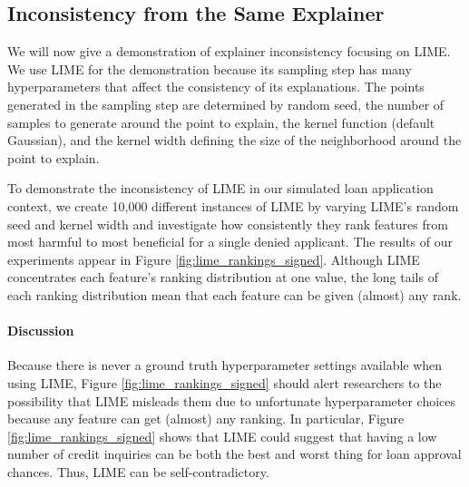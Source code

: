 \documentclass[12pt]{article}    %
\begin{document}
    \subsection*{Inconsistency from the Same Explainer}
            \label{sec:conflict_within}
        We will now give a demonstration of explainer inconsistency focusing on LIME. We use LIME for the demonstration because its sampling step has many hyperparameters that affect the consistency of its explanations. The points generated in the sampling step are determined by random seed, the number of samples to generate around the point to explain, the kernel function (default Gaussian), and the kernel width defining the size of the neighborhood around the point to explain. 

             To demonstrate the inconsistency of LIME in our simulated loan application context, we create 10,000 different instances of LIME by varying LIME's random seed and kernel width and investigate how consistently they rank features from most harmful to most beneficial for a single denied applicant. The results of our experiments appear in Figure \ref{fig:lime_rankings_signed}. Although LIME concentrates each feature's ranking distribution at one value, the long tails of each ranking distribution mean that each feature can be given (almost) any rank.

             \paragraph{Discussion}
             Because there is never a ground truth hyperparameter settings available when using LIME, Figure \ref{fig:lime_rankings_signed} should alert researchers to the possibility that LIME misleads them due to unfortunate hyperparameter choices because any feature can get (almost) any ranking. In particular, Figure \ref{fig:lime_rankings_signed} shows that LIME could suggest that having a low number of credit inquiries can be both the best and worst thing for loan approval chances. Thus, LIME can be self-contradictory.
\end{document}
